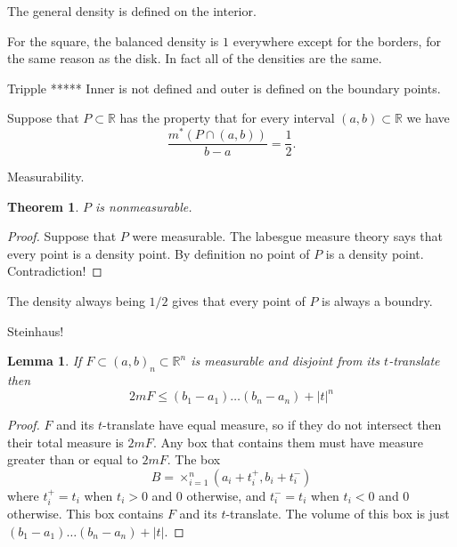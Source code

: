 \documentclass[letter]{article}
\newtheorem{theorem}{Theorem}
\newtheorem{lemma}{Lemma}
\newenvironment{menumerate}{%
  \edef\backupindent{\the\parindent}%
  \enumerate%
  \setlength{\parindent}{\backupindent}%
}{\endenumerate}
\begin{document}
\begin{menumerate}
\begin{menumerate}
		The general density is defined on the interior.
		\item For the square, the balanced density is $1$ everywhere except for the borders, for the same reason as the disk. In fact all of the densities are the same.
		\item Tripple ***** Inner is not defined and outer is defined on the boundary points.
	\end{menumerate}
	\item Suppose that $P \subset \mathbb{R}$ has the property that for every interval $(a,b) \subset \mathbb{R}$ we have
	\begin{equation}
		\frac{m^*(P \cap (a,b))}{b-a} = \frac{1}{2}.
	\end{equation}
	\begin{menumerate}
		\item Measurability.
		\begin{theorem}
			$P$ is nonmeasurable.
		\end{theorem}
		\begin{proof}
			Suppose that $P$ were measurable. The labesgue measure theory says that every point is a density point. By definition no point of $P$ is a density point. Contradiction!
		\end{proof}
		\item The density always being $1/2$ gives that every point of $P$ is always a boundry.
	\end{menumerate}
	\item Steinhaus!
	\begin{lemma}
		If $F \subset (a,b)_n \subset \mathbb{R}^n$ is measurable and disjoint from its $t$-translate then
		\begin{equation}
			2mF \leq (b_1-a_1)\dots(b_n - a_n) + |t|^n 
		\end{equation}
	\end{lemma}
	\begin{proof}
		$F$ and its $t$-translate have equal measure, so if they do not intersect then their total measure is $2mF$. Any box that contains them must have measure greater than or equal to $2mF$.
		The box 
		\begin{equation}
			B = \times_{i=1}^n (a_i + t_i^+, b_i + t_i^-)
		\end{equation}
		where $t_i^+ = t_i$ when $t_i > 0$ and $0$ otherwise, and $t_i^- = t_i$ when $t_i < 0$ and $0$ otherwise. This box contains $F$ and its $t$-translate.
		The volume of this box is just $(b_1-a_1)\dots(b_n - a_n) + |t|$. 
	\end{proof}

\end{menumerate}
\end{document}
